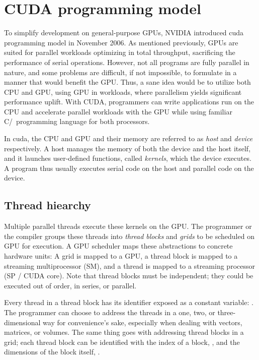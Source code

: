 \section{CUDA programming model} \label{label:cuda}

To simplify development on general-purpose GPUs, NVIDIA introduced \acrfull{cuda} programming model in November 2006. As mentioned previously, GPUs are suited for parallel workloads optimizing in total throughput, sacrificing the performance of serial operations. However, not all programs are fully parallel in nature, and some problems are difficult, if not impossible, to formulate in a manner that would benefit the GPU. Thus, a sane idea would be to utilize both CPU and GPU, using GPU in workloads, where parallelism yields significant performance uplift. With CUDA, programmers can write applications run on the CPU and accelerate parallel workloads with the GPU while using familiar C/\CC\ programming language for both processors.

In \acrshort{cuda}, the CPU and GPU and their memory are referred to as \textit{host} and \textit{device} respectively. A host manages the memory of both the device and the host itself, and it launches user-defined functions, called \textit{kernels}, which the device executes. A program thus usually executes serial code on the host and parallel code on the device.

\subsection{Thread hiearchy}

Multiple parallel threads execute these kernels on the GPU. The programmer or the compiler groups these threads into \textit{thread blocks} and \textit{grids} to be scheduled on GPU for execution. A GPU scheduler maps these abstractions to concrete hardware units: A grid is mapped to a GPU, a thread block is mapped to a streaming multiprocessor (SM), and a thread is mapped to a streaming processor (SP / CUDA core). Note that thread blocks must be independent; they could be executed out of order, in series, or parallel.

Every thread in a thread block has its identifier exposed as a constant variable: . The programmer can choose to address the threads in a one, two, or three-dimensional way for convenience's sake, especially when dealing with vectors, matrices, or volumes. The same thing goes with addressing thread blocks in a grid; each thread block can be identified with the index of a block, , and the dimensions of the block itself, .

